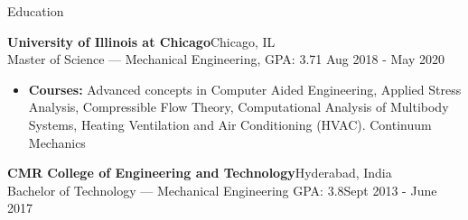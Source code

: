\documentclass{resume}
\begin{document}
\begin{rSection}{Education}

\textbf{University of Illinois at Chicago}\hfill Chicago, IL\\
Master of Science --- Mechanical Engineering, GPA: 3.71 \hfill Aug 2018 - May 2020
\vspace{-0.5em}
\begin{itemize}
 \setlength\itemsep{-0.5em}
    \item \textbf{Courses:} Advanced concepts in Computer Aided Engineering, Applied Stress Analysis, Compressible Flow Theory, Computational Analysis of Multibody Systems, Heating Ventilation and Air Conditioning (HVAC). Continuum Mechanics
\end{itemize}

\textbf{CMR College of Engineering and Technology}\hfill Hyderabad, India\\
\vspace{-0.5em}
Bachelor of Technology --- Mechanical Engineering GPA: 3.8\hfill Sept 2013 - June 2017

\end{rSection}



\end{document}
